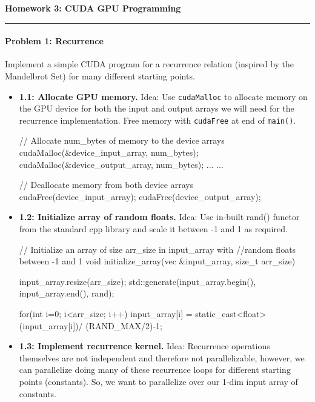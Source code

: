 \documentclass[12pt,letterpaper,twoside]{article}
\begin{document}
{\centering \textbf{Homework 3: CUDA GPU Programming\\}}
\vspace*{-8pt}\noindent\rule{\linewidth}{1pt}

\paragraph{Problem 1: Recurrence } Implement a simple CUDA program for 
a recurrence relation (inspired by the Mandelbrot Set) for many 
different starting points.

\begin{itemize}
    \item \textbf{1.1: Allocate GPU memory.} Idea: Use \texttt{cudaMalloc}
    to allocate memory on the GPU device for both the input and output 
    arrays we will need for the recurrence implementation. Free memory 
    with \texttt{cudaFree} at end of \texttt{main()}.

\begin{cpp}
// Allocate num_bytes of memory to the device arrays
cudaMalloc(&device_input_array, num_bytes);
cudaMalloc(&device_output_array, num_bytes);
...
...

// Deallocate memory from both device arrays
cudaFree(device_input_array);
cudaFree(device_output_array);
\end{cpp}

    \item \textbf{1.2: Initialize array of random floats.} Idea: Use in-built
    rand() functor from the standard cpp library and scale it between -1 
    and 1 as required.

\begin{cpp}
// Initialize an array of size arr_size in input_array with 
//random floats between -1 and 1
void initialize_array(vec &input_array, size_t arr_size) {
    input_array.resize(arr_size);
    std::generate(input_array.begin(), input_array.end(), rand);

    for(int i=0; i<arr_size; i++){
    input_array[i] = static_cast<float>(input_array[i])/
                        (RAND_MAX/2)-1;
    }    
}
\end{cpp}

    \item \textbf{1.3: Implement recurrence kernel.} Idea: Recurrence operations 
    themselves are not independent and therefore not parallelizable, however, 
    we can parallelize doing many of these recurrence loops for different 
    starting points (constants). So, we want to parallelize over our 1-dim 
    input array of constants.


\end{itemize}
\end{document}
